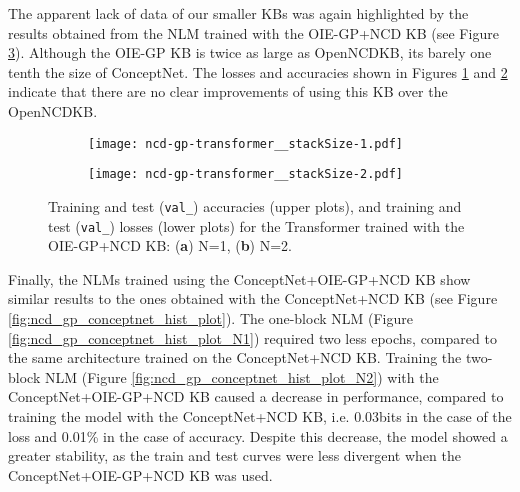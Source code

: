 \documentclass[preprint]{elsarticle}
\begin{document}
The apparent lack of data of our smaller KBs was again highlighted by the results obtained from the NLM trained with the OIE-GP+NCD KB (see Figure \ref{fig:ncd_gp_hist_plot}). Although the OIE-GP KB is twice as large as OpenNCDKB, its barely one tenth the size of ConceptNet. The losses and accuracies shown in Figures \ref{fig:ncd_gp_hist_plot_N1} and \ref{fig:ncd_gp_hist_plot_N2} indicate that there are no clear improvements of using this KB over the OpenNCDKB.
\begin{figure}[htb]
	\centering
	\hspace*{\fill}
	\begin{subfigure}[b]{.48\linewidth}
		\centering
		\texttt{[image: ncd-gp-transformer\_\_stackSize-1.pdf]}
		\captionsetup{justification=centering}
		\caption{}
        \label{fig:ncd_gp_hist_plot_N1}
	\end{subfigure}
	\hspace*{\fill}
	\begin{subfigure}[b]{.48\linewidth}
		\centering
		\texttt{[image: ncd-gp-transformer\_\_stackSize-2.pdf]}
		\captionsetup{justification=centering}
		\caption{}
        \label{fig:ncd_gp_hist_plot_N2}
	\end{subfigure}
	\hspace*{\fill}
	\caption{Training and test (\texttt{val\_}) accuracies (upper plots), and training and test (\texttt{val\_}) losses (lower plots) for the Transformer trained with the OIE-GP+NCD KB: (\textbf{a}) N=1, (\textbf{b}) N=2. }
	\label{fig:ncd_gp_hist_plot}
\end{figure}

Finally, the NLMs trained using the ConceptNet+OIE-GP+NCD KB show similar results to the ones obtained with the ConceptNet+NCD KB (see Figure \ref{fig:ncd_gp_conceptnet_hist_plot}). The one-block NLM (Figure \ref{fig:ncd_gp_conceptnet_hist_plot_N1}) required two less epochs, compared to the same architecture trained on the ConceptNet+NCD KB. Training the two-block NLM (Figure \ref{fig:ncd_gp_conceptnet_hist_plot_N2}) with the ConceptNet+OIE-GP+NCD KB caused a decrease in performance, compared to training the model with the ConceptNet+NCD KB, i.e. 0.03bits in the case of the loss and 0.01\% in the case of accuracy. Despite this decrease, the model showed a greater stability, as the train and test curves were less divergent when the ConceptNet+OIE-GP+NCD KB was used.
\end{document}
